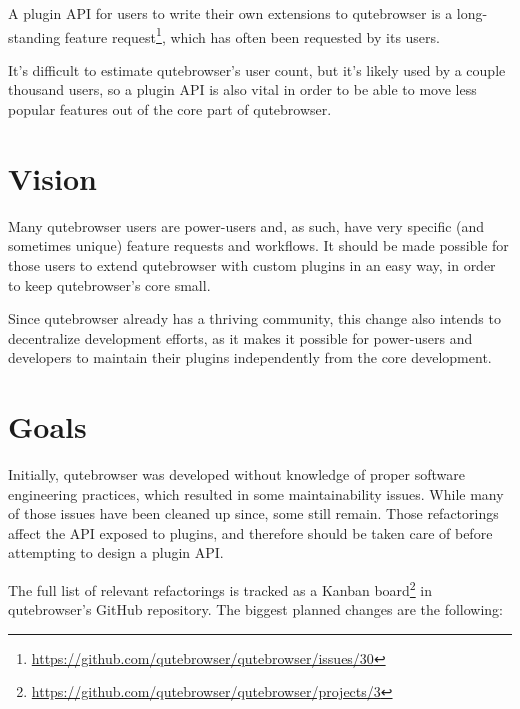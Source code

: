 \documentclass[a4paper,parskip=full]{scrreprt}
\begin{document}
A plugin API for users to write their own extensions to qutebrowser is a
long-standing feature
request\footnote{\url{https://github.com/qutebrowser/qutebrowser/issues/30}},
which has often been requested by its users.

It's difficult to estimate qutebrowser's user count, but it's likely used by a
couple thousand users, so a plugin API is also vital in order to be able to move
less popular features out of the core part of qutebrowser.

\section{Vision}

Many qutebrowser users are power-users and, as such, have very specific (and
sometimes unique) feature requests and workflows. It should be made possible for
those users to extend qutebrowser with custom plugins in an easy way, in order
to keep qutebrowser's core small.

Since qutebrowser already has a thriving community, this change also intends to
decentralize development efforts, as it makes it possible for power-users and
developers to maintain their plugins independently from the core development.

\section{Goals}

Initially, qutebrowser was developed without knowledge of proper software
engineering practices, which resulted in some maintainability issues. While many
of those issues have been cleaned up since, some still remain. Those
refactorings affect the API exposed to plugins, and therefore should be taken
care of before attempting to design a plugin API.

The full list of relevant refactorings is tracked as a Kanban
board\footnote{\url{https://github.com/qutebrowser/qutebrowser/projects/3}} in
qutebrowser's GitHub repository. The biggest planned changes are the following:
\end{document}

